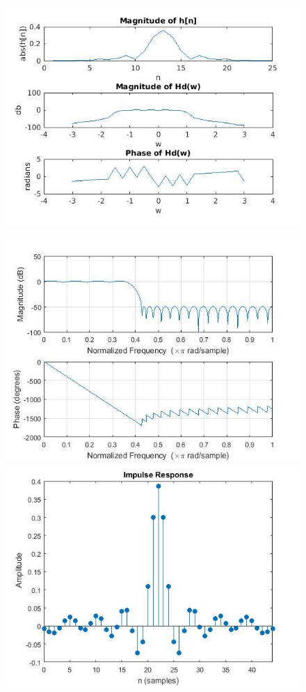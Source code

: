 \documentclass{article}
\begin{document}
\begin{figure}[H]

\includegraphics[scale = .5]{report3}
\end{figure}

\begin{figure}[H]

\includegraphics[scale = .5]{report4}
\includegraphics[scale = .5]{report4i}
\end{figure}
\end{document}
